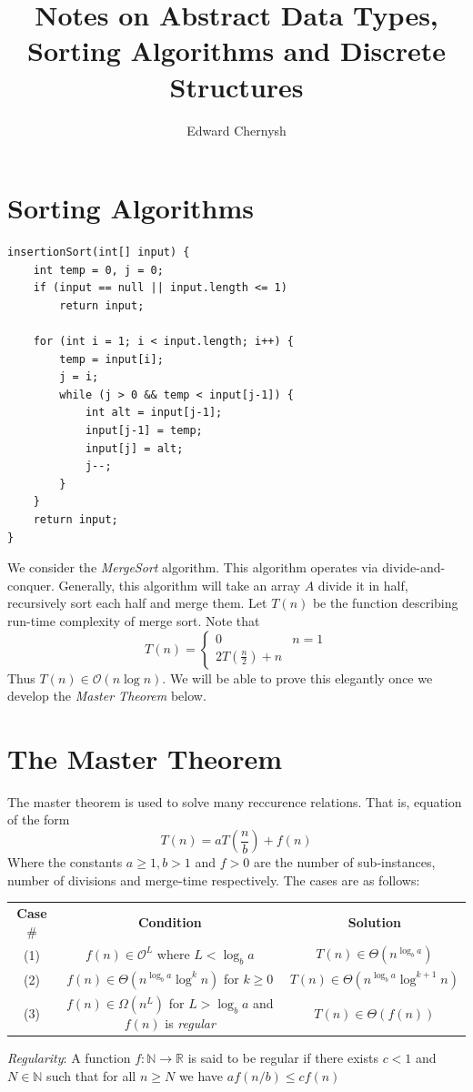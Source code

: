 \documentclass[9pt]{article} %
\title{Notes on Abstract Data Types, Sorting Algorithms and Discrete Structures}
\author{Edward Chernysh}
\date{}
\newcommand{\NN}{\mathbb{N}} %
\newcommand{\RR}{\mathbb{R}} %
\begin{document}
	\maketitle
	\section{\large Sorting Algorithms}
	\begin{lstlisting}
insertionSort(int[] input) {
	int temp = 0, j = 0;
	if (input == null || input.length <= 1)
		return input;
	
	for (int i = 1; i < input.length; i++) {
		temp = input[i];
		j = i;
		while (j > 0 && temp < input[j-1]) {
			int alt = input[j-1];
			input[j-1] = temp;
			input[j] = alt;
			j--;
		}
	}
	return input;
}
	\end{lstlisting}
	We consider the \emph{MergeSort} algorithm. This algorithm operates via divide-and-conquer. Generally, this algorithm will take an array $A$ divide it in half, recursively sort each half and merge them. Let $T(n)$ be the function describing run-time complexity of merge sort. Note that
	$$ T(n) = \begin{cases}
		0 & n = 1 \\
		2T(\frac{n}{2}) + n
	\end{cases} $$
	Thus $T(n) \in \mathcal{O}(n\log{n})$. We will be able to prove this elegantly once we develop the \emph{Master Theorem} below.
	\section{\large The Master Theorem}
		The master theorem is used to solve many reccurence relations. That is, equation of the form 
		$$ T(n) = aT\left(\frac{n}{b}\right) + f(n) $$
		Where the constants $a\geq 1, b > 1$ and $f > 0$ are the number of sub-instances, number of divisions and merge-time respectively. The cases are as follows:
		\begin{center}
		\begin{tabular}{ | c | c | c |}
			\hline
			\textbf{Case} \# & \textbf{Condition} & \textbf{Solution} \\
			 
			(1) & $f(n) \in \mathcal{O}^L$ where $L < \log_b{a}$ & $T(n) \in \Theta(n^{\log_b{a}})$ \\
			(2) & $f(n) \in \Theta(n^{\log_b{a}}\log^k{n})$ for $k \geq 0$ & $T(n) \in \Theta(n^{\log_b{a}}\log^{k+1}{n})$ \\
			(3) & $f(n) \in \Omega(n^L)$ for $L > \log_b{a}$ and $f(n)$ is \emph{regular} & $T(n) \in \Theta(f(n))$\\
			\hline
		\end{tabular}
		$$ $$
		\noindent \emph{Regularity}: A function $f: \NN \rightarrow \RR$ is said to be regular if there exists $c < 1$ and $N \in \NN$ such that for all $n \geq N$ we have $af(n/b) \leq cf(n)$
		\end{center}
		
\end{document}
